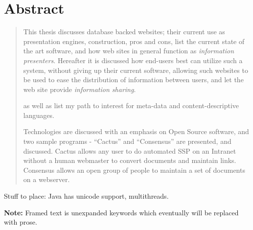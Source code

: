 \maketitle

\section{Abstract}
\label{sec:abstract}


\begin{quote}
  This thesis discusses database backed websites; their current use as
  presentation engines, construction, pros and cons, list the current
  state of the art software, and how web sites in general function as
  \textit{information presenters}.  Hereafter it is discussed how
  end-users best can utilize such a system, without giving up their
  current software, allowing such websites to be used to ease the
  distribution of information between users, and let the web site
  provide \textit{information sharing}.

  as well as list my path to interest for meta-data and
  content-descriptive languages.
  
  Technologies are discussed with an emphasis on Open Source software,
  and two sample programs - ``Cactus'' and ``Consensus'' are
  presented,  and discussed.  Cactus allows any user to do automated
  SSP on an Intranet without a human webmaster to convert documents
  and maintain links.  Consensus allows an open group of people to
  maintain a set of documents on a webserver.

  
  
\end{quote}

Stuff to place:  Java has unicode support, multithreads.


\textbf{Note: }Framed text is unexpanded keywords which eventually
will be replaced with prose.

